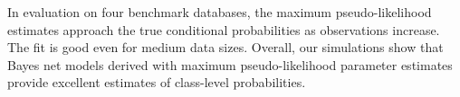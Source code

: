 \documentclass[oribibl]{llncs}
\begin{document}
In evaluation on four benchmark databases, the maximum pseudo-likelihood estimates approach the true conditional probabilities as observations increase. The fit is good even for medium data sizes. 
Overall, our simulations show that Bayes net models derived with maximum pseudo-likelihood parameter estimates provide excellent estimates of class-level probabilities.
\end{document}
